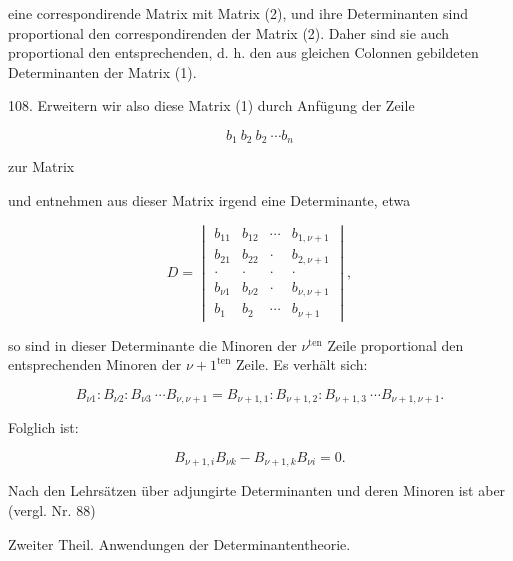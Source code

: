 eine correspondirende Matrix mit Matrix (2), und ihre Determinanten sind proportional den correspondirenden der Matrix (2). Daher sind sie auch proportional den entsprechenden, d. h. den aus gleichen Colonnen gebildeten Determinanten der Matrix (1).

108. Erweitern wir also diese Matrix (1) durch Anf\"ugung der Zeile

\[
b_1\ b_2\ b_2\ \cdots b_n
\]

zur Matrix


und entnehmen aus dieser Matrix irgend eine Determinante, etwa

\[
D=
\begin{vmatrix}
b_{11} & b_{12} & \cdots & b_{1,\nu+1} \\
b_{21} & b_{22} & \cdot & b_{2,\nu+1} \\
\cdot & \cdot & \cdot & \cdot \\
b_{\nu 1} & b_{\nu 2} & \cdot & b_{\nu,\nu+1} \\
b_1 & b_2 & \cdots & b_{\nu+1}
\end{vmatrix},
\]

so sind in dieser Determinante die Minoren der $\nu^{\text{ten}}$ Zeile proportional den entsprechenden Minoren der $\nu+1^{\text{ten}}$ Zeile. Es verh\"alt sich:

\[
B_{\nu 1}:B_{\nu 2}:B_{\nu 3}\ \cdots B_{\nu,\nu+1} = B_{\nu+1,1}:B_{\nu+1,2}:B_{\nu+1,3}\ \cdots B_{\nu+1,\nu+1}.
\]

Folglich ist:

\[
B_{\nu+1,i}B_{\nu k} - B_{\nu+1,k}B_{\nu i} = 0.
\]

Nach den Lehrs\"atzen \"uber adjungirte Determinanten und deren Minoren ist aber (vergl. Nr. 88)


 \quad Zweiter Theil. Anwendungen der Determinantentheorie.

